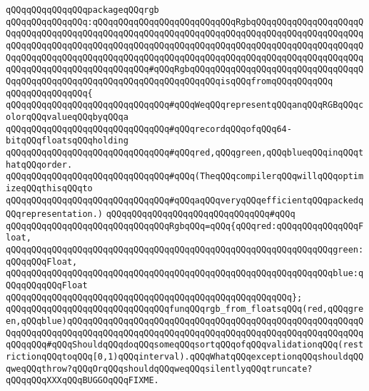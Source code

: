 \newline
\verb|qQQqqQQqqQQqqQQqpackageqQQqrgb|\newline
\verb|qQQqqQQqqQQqqQQq:qQQqqQQqqQQqqQQqqQQqqQQqqQQqRgbqQQqqQQqqQQqqQQqqQQqqQQqqQQqqQQqqQQqqQQqqQQqqQQqqQQqqQQqqQQqqQQqqQQqqQQqqQQqqQQqqQQqqQQqqQQqqQQqqQQqqQQqqQQqqQQqqQQqqQQqqQQqqQQqqQQqqQQqqQQqqQQqqQQqqQQqqQQqqQQqqQQqqQQqqQQqqQQqqQQqqQQqqQQqqQQqqQQqqQQqqQQqqQQqqQQqqQQqqQQqqQQqqQQqqQQqqQQqqQQqqQQqqQQqqQQqqQQqqQQq#qQQqRgbqQQqqQQqqQQqqQQqqQQqqQQqqQQqqQQqqQQqqQQqqQQqqQQqqQQqqQQqqQQqqQQqqQQqqQQqqQQqisqQQqfromqQQqqQQqqQQq|\newline
\verb|qQQqqQQqqQQqqQQq{|\newline
\newline
\verb|qQQqqQQqqQQqqQQqqQQqqQQqqQQqqQQq#qQQqWeqQQqrepresentqQQqanqQQqRGBqQQqcolorqQQqvalueqQQqbyqQQqa|\newline
\verb|qQQqqQQqqQQqqQQqqQQqqQQqqQQqqQQq#qQQqrecordqQQqofqQQq64-bitqQQqfloatsqQQqholding|\newline
\verb|qQQqqQQqqQQqqQQqqQQqqQQqqQQqqQQq#qQQqred,qQQqgreen,qQQqblueqQQqinqQQqthatqQQqorder.|\newline
\verb|qQQqqQQqqQQqqQQqqQQqqQQqqQQqqQQq#qQQq(TheqQQqcompilerqQQqwillqQQqoptimizeqQQqthisqQQqto|\newline
\verb|qQQqqQQqqQQqqQQqqQQqqQQqqQQqqQQq#qQQqaqQQqveryqQQqefficientqQQqpackedqQQqrepresentation.)|\newline
\verb|qQQqqQQqqQQqqQQqqQQqqQQqqQQqqQQq#qQQq|\newline
\verb|qQQqqQQqqQQqqQQqqQQqqQQqqQQqqQQqRgbqQQq=qQQq{qQQqred:qQQqqQQqqQQqqQQqFloat,|\newline
\verb|qQQqqQQqqQQqqQQqqQQqqQQqqQQqqQQqqQQqqQQqqQQqqQQqqQQqqQQqqQQqqQQqgreen:qQQqqQQqFloat,|\newline
\verb|qQQqqQQqqQQqqQQqqQQqqQQqqQQqqQQqqQQqqQQqqQQqqQQqqQQqqQQqqQQqqQQqblue:qQQqqQQqqQQqFloat|\newline
\verb|qQQqqQQqqQQqqQQqqQQqqQQqqQQqqQQqqQQqqQQqqQQqqQQqqQQqqQQq};|\newline
\newline
\newline
\newline
\verb|qQQqqQQqqQQqqQQqqQQqqQQqqQQqqQQqfunqQQqrgb_from_floatsqQQq(red,qQQqgreen,qQQqblue)qQQqqQQqqQQqqQQqqQQqqQQqqQQqqQQqqQQqqQQqqQQqqQQqqQQqqQQqqQQqqQQqqQQqqQQqqQQqqQQqqQQqqQQqqQQqqQQqqQQqqQQqqQQqqQQqqQQqqQQqqQQqqQQqqQQqqQQq#qQQqShouldqQQqdoqQQqsomeqQQqsortqQQqofqQQqvalidationqQQq(restrictionqQQqtoqQQq[0,1)qQQqinterval).qQQqWhatqQQqexceptionqQQqshouldqQQqweqQQqthrow?qQQqOrqQQqshouldqQQqweqQQqsilentlyqQQqtruncate?qQQqqQQqXXXqQQqBUGGOqQQqFIXME.|\newline
